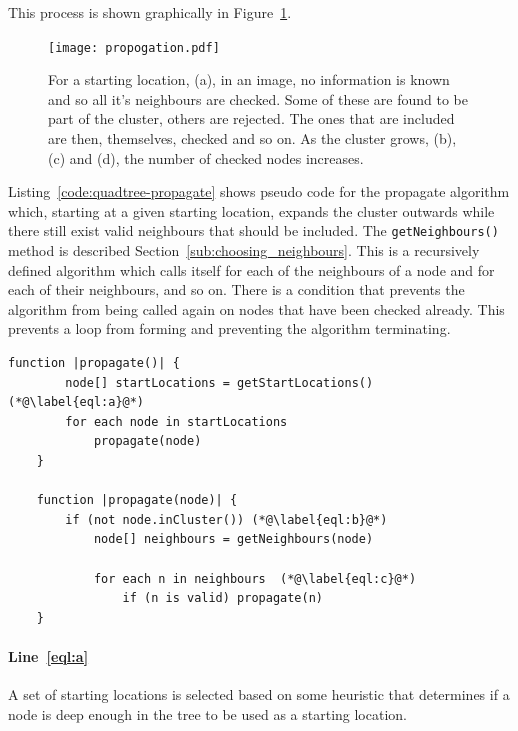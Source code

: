 This process is shown graphically in Figure~\ref{fig:propogation}.

\begin{figure}[tbh]
	\centering
	\texttt{[image: propogation.pdf]}

	\caption[Propagation of a cluster from a starting location.]{For a starting
		location, (a), in an image, no information is known and so all it's
		neighbours are checked. Some of these are found to be part of the
		cluster, others are rejected. The ones that are included are then,
		themselves, checked and so on. As the cluster grows, (b), (c) and
		(d), the number of checked nodes increases.}\label{fig:propogation}
\end{figure}

Listing~\ref{code:quadtree-propagate} shows pseudo code for the propagate
algorithm which, starting at a given starting location, expands the cluster
outwards while there still exist valid neighbours that should be included. The
\texttt{getNeighbours()} method is described
Section~\ref{sub:choosing_neighbours}. This is a recursively defined algorithm
which calls itself for each of the neighbours of a node and for each of their
neighbours, and so on. There is a condition that prevents the algorithm from
being called again on nodes that have been checked already. This prevents a
loop from forming and preventing the algorithm terminating.

\begin{center}
\begin{minipage}{\textwidth}
\begin{lstlisting}[caption={[Code for the propagate algorithm.]Code for the
	propagate algorithm which expands an initial starting location to a
	cluster.}, label=code:quadtree-propagate]
	function |propagate()| {
		node[] startLocations = getStartLocations() (*@\label{eql:a}@*)
		for each node in startLocations
			propagate(node)
	}

	function |propagate(node)| {
		if (not node.inCluster()) (*@\label{eql:b}@*)
			node[] neighbours = getNeighbours(node)

			for each n in neighbours  (*@\label{eql:c}@*)
				if (n is valid) propagate(n)
	}
\end{lstlisting}
\end{minipage}
\end{center}

\paragraph{Line~\ref{eql:a}} A set of starting locations is selected based on
some heuristic that determines if a node is deep enough in the tree to be used
as a starting location.

